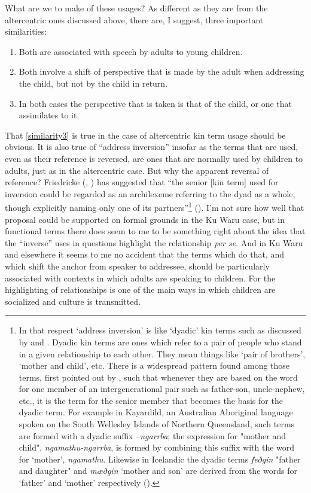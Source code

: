 \documentclass[output=paper]{langsci/langscibook}
\begin{document}
What are we to make of these usages? As different as they are from the altercentric ones discussed above, there are, I suggest, three important similarities:

\begin{enumerate}
	\item Both are associated with speech by adults to young children.
	\item Both involve a shift of perspective that is made by the adult when addressing the child, but not by the child in return.
	\item In both cases the perspective that is taken is that of the child, or one that assimilates to it.\label{similarity3}
\end{enumerate}

That \ref{similarity3} is true in the case of altercentric kin term usage should be obvious. It is also true of “address inversion” insofar as the terms that are used, even as their reference is reversed, are ones that are normally used by children to adults, just as in the altercentric case. But why the apparent reversal of reference?  Friedricke \citeauthor{Braun1985} (\citeyear{Braun1985}, \citeyear{Braun1988}) has suggested that “the senior [kin term] used for inversion could be regarded as an archilexeme referring to the dyad as a whole, though explicitly naming only one of its partners”\footnote{In that respect ‘address inversion’ is like ‘dyadic’ kin terms such as discussed by \cite{MerlanHeath1982} and \cite{Evans2006}. Dyadic kin terms are ones which refer to a pair of people who stand in a given relationship to each other. They mean things like ‘pair of brothers’, ‘mother and child’, etc.  There is a widespread pattern found among those terms, first pointed out by \cite{MerlanHeath1982}, such that whenever they are based on the word for one member of an intergenerational pair such as father-son, uncle-nephew, etc., it is the term for the senior member that becomes the basis for the dyadic term. For example in Kayardild, an Australian Aboriginal language spoken on the South Wellesley Islands of Northern Queensland, such terms are formed with a dyadic suffix –\textit{ngarrba}; the expression for "mother and child", \textit{ngamathu-ngarrba}, is formed by combining this suffix with the word for ‘mother’, \textit{ngamathu}. Likewise in Icelandic the dyadic terms \textit{feðgin} "father and daughter" and \textit{mæðgin} ‘mother and son’ are derived from the words for ‘father’ and ‘mother’ respectively (\citealt{Evans2006}).} (\citealt[285]{Braun1988}). I’m not sure how well that proposal could be supported on formal grounds in the Ku Waru case, but in functional terms there does seem to me to be something right about the idea that the “inverse” uses in questions highlight the relationship \textit{per se}. And in Ku Waru and elsewhere it seems to me no accident that the terms which do that, and which shift the anchor from speaker to addressee, should be particularly associated with contexts in which adults are speaking to children. For the highlighting of relationships is one of the main ways in which children are socialized and culture is transmitted.
\end{document}
